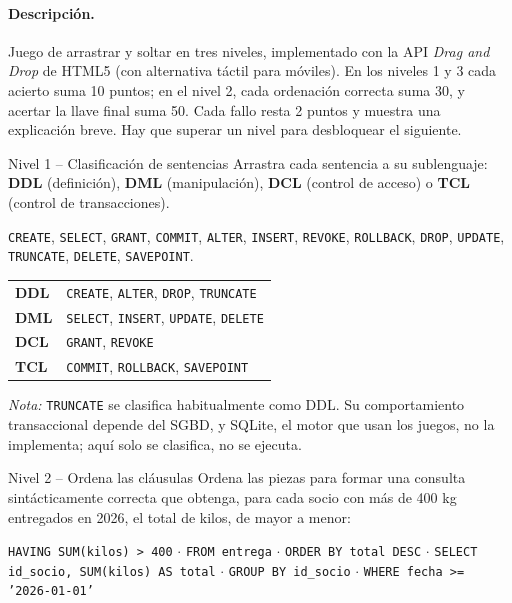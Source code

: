 \documentclass[11pt,a4paper]{article}
\begin{document}
\paragraph{Descripción.} Juego de arrastrar y soltar en tres niveles, implementado con la API
\emph{Drag and Drop} de HTML5 (con alternativa táctil para móviles). En los niveles 1 y 3
cada acierto suma 10 puntos; en el nivel 2, cada ordenación correcta suma 30, y acertar la
llave final suma 50. Cada fallo resta 2 puntos y muestra una explicación breve. Hay que superar un nivel para
desbloquear el siguiente.

\begin{reto}{Nivel 1 -- Clasificación de sentencias}
Arrastra cada sentencia a su sublenguaje: \textbf{DDL} (definición), \textbf{DML}
(manipulación), \textbf{DCL} (control de acceso) o \textbf{TCL} (control de transacciones).

\texttt{CREATE}, \texttt{SELECT}, \texttt{GRANT}, \texttt{COMMIT}, \texttt{ALTER},
\texttt{INSERT}, \texttt{REVOKE}, \texttt{ROLLBACK}, \texttt{DROP}, \texttt{UPDATE},
\texttt{TRUNCATE}, \texttt{DELETE}, \texttt{SAVEPOINT}.
\end{reto}

\begin{solucion}
\begin{tabularx}{\linewidth}{@{}>{\bfseries}lX@{}}
DDL & \texttt{CREATE}, \texttt{ALTER}, \texttt{DROP}, \texttt{TRUNCATE} \\
DML & \texttt{SELECT}, \texttt{INSERT}, \texttt{UPDATE}, \texttt{DELETE} \\
DCL & \texttt{GRANT}, \texttt{REVOKE} \\
TCL & \texttt{COMMIT}, \texttt{ROLLBACK}, \texttt{SAVEPOINT} \\
\end{tabularx}

\smallskip
\emph{Nota:} \texttt{TRUNCATE} se clasifica habitualmente como DDL. Su comportamiento
transaccional depende del SGBD, y SQLite, el motor que usan los juegos, no la implementa; aquí
solo se clasifica, no se ejecuta.
\end{solucion}

\begin{reto}{Nivel 2 -- Ordena las cláusulas}
Ordena las piezas para formar una consulta sintácticamente correcta que obtenga, para
cada socio con más de 400 kg entregados en 2026, el total de kilos, de mayor a menor:

\texttt{HAVING SUM(kilos) > 400} $\cdot$ \texttt{FROM entrega} $\cdot$
\texttt{ORDER BY total DESC} $\cdot$ \texttt{SELECT id\_socio, SUM(kilos) AS total} $\cdot$
\texttt{GROUP BY id\_socio} $\cdot$ \texttt{WHERE fecha >= '2026-01-01'}
\end{reto}
\end{document}
